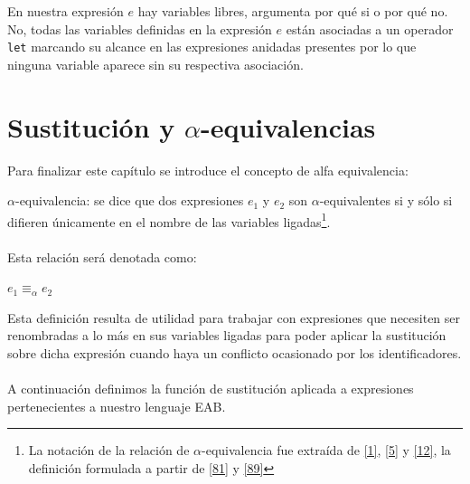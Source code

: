     \bigskip
    
    \begin{exercise}
        En nuestra expresión $e$ hay variables libres, argumenta por qué si o por qué no. \\
    
        No, todas las variables definidas en la expresión $e$ están asociadas a un operador \texttt{let} marcando su alcance en las expresiones anidadas presentes por lo que ninguna variable aparece sin su respectiva asociación.
    \end{exercise}


\section{Sustitución y $\alpha$-equivalencias}
    Para finalizar este capítulo se introduce el concepto de alfa equivalencia:

    \begin{definition}$\alpha$-equivalencia: se dice que dos expresiones $e_1$ y $e_2$ son $\alpha$-equivalentes si y sólo si difieren únicamente en el nombre de las variables ligadas\footnote{La notación de la relación de $\alpha$-equivalencia fue extraída de \hyperlink{1}{[1]}, \hyperlink{5}{[5]} y \hyperlink{12}{[12]}, la definición formulada a partir de \hyperlink{81}{[81]} y \hyperlink{89}{[89]}}.\\\\
    Esta relación será denotada como: 
    \begin{center}
            $e_1\equiv_\alpha e_2$        
    \end{center}
    \end{definition}

    Esta definición resulta de utilidad para trabajar con expresiones que necesiten ser renombradas a lo más en sus variables ligadas para poder aplicar la sustitución sobre dicha expresión cuando haya un conflicto ocasionado por los identificadores. \\\\
    A continuación definimos la función de sustitución aplicada a expresiones pertenecientes a nuestro lenguaje \textsf{EAB}.

